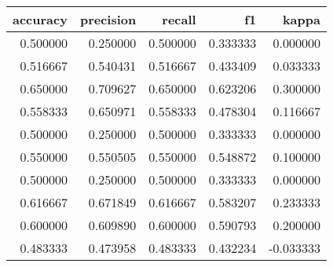 \begin{tabular}{rrrrr}
\toprule
accuracy & precision & recall & f1 & kappa \\
\midrule
0.500000 & 0.250000 & 0.500000 & 0.333333 & 0.000000 \\
0.516667 & 0.540431 & 0.516667 & 0.433409 & 0.033333 \\
0.650000 & 0.709627 & 0.650000 & 0.623206 & 0.300000 \\
0.558333 & 0.650971 & 0.558333 & 0.478304 & 0.116667 \\
0.500000 & 0.250000 & 0.500000 & 0.333333 & 0.000000 \\
0.550000 & 0.550505 & 0.550000 & 0.548872 & 0.100000 \\
0.500000 & 0.250000 & 0.500000 & 0.333333 & 0.000000 \\
0.616667 & 0.671849 & 0.616667 & 0.583207 & 0.233333 \\
0.600000 & 0.609890 & 0.600000 & 0.590793 & 0.200000 \\
0.483333 & 0.473958 & 0.483333 & 0.432234 & -0.033333 \\
\bottomrule
\end{tabular}
